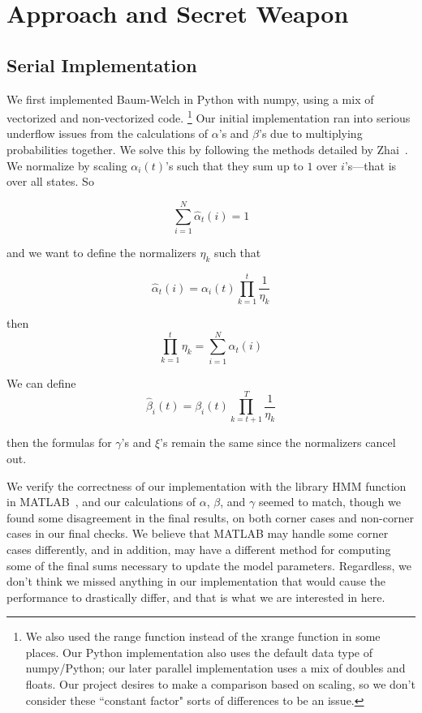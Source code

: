 \section{Approach and Secret Weapon}

\subsection{Serial Implementation}
We first implemented Baum-Welch in Python with numpy, using a mix of vectorized and non-vectorized code.  \footnote{We also used the range function instead of the xrange function in some places.  Our Python implementation also uses the default data type of numpy/Python; our later parallel implementation uses a mix of doubles and floats.  Our project desires to make a comparison based on scaling, so we don't consider these ``constant factor" sorts of differences to be an issue.}  Our initial
implementation ran into serious underflow issues from the calculations of
$\alpha$'s and $\beta$'s due to multiplying probabilities together. We solve
this by following the methods detailed by Zhai~\cite{normalizer}. We normalize by scaling $\alpha_i(t)$'s such that they sum up to $1$ over $i$'s---that is over all states. So 

\begin{equation} 
\sum_{i=1}^N \hat{\alpha}_t(i) = 1
\end{equation}

and we want to define the normalizers $\eta_k$ such that

\begin{equation} 
    \hat{\alpha}_t(i) = \alpha_i(t) \prod_{k=1}^t \frac{1}{\eta_k}
\end{equation}

then 
\begin{equation}
\prod_{k=1}^t \eta_k =\sum_{i=1}^N \alpha_t(i)
\end{equation}

We can define 
\begin{equation} 
    \hat{\beta}_{i}(t) = \beta_{i}(t) \prod_{k=t+1}^T \frac{1}{\eta_k}
\end{equation}

then the formulas for $\gamma$'s and $\xi$'s remain the same since the normalizers cancel out.

We verify the correctness of our implementation with the library HMM function in
MATLAB~\cite{matlab}, and our calculations of $\alpha$, $\beta$, and $\gamma$ seemed to match, though we found some disagreement in the final results, on both corner cases and non-corner cases in our final checks.  We believe that MATLAB may handle some corner cases differently, and in addition, may have a different method for computing some of the final sums necessary to update the model parameters.  Regardless, we don't think we missed anything in our implementation that would cause the performance to drastically differ, and that is what we are interested in here. 

